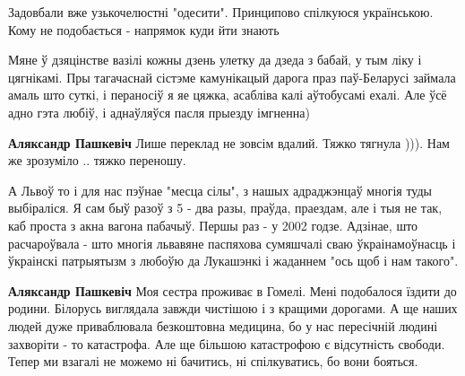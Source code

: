 \begin{itemize}
Задовбали вже узькочелюстні "одесити". Принципово спілкуюся українською. Кому не подобається - напрямок куди йти знають

 

Мяне ў дзяцінстве вазілі кожны дзень улетку да дзеда з бабай, у тым ліку і
цягнікамі. Пры тагачаснай сістэме камунікацый дарога праз паў-Беларусі займала
амаль што суткі, і пераносіў я яе цяжка, асабліва калі аўтобусамі ехалі. Але
ўсё адно гэта любіў, і аднаўляўся пасля прыезду імгненна)

\begin{itemize}
 
\textbf{Аляксандр Пашкевіч} Лише переклад не зовсім вдалий. Тяжко тягнула ))). Нам же зрозуміло .. тяжко переношу.
\end{itemize}

 

А Львоў то і для нас пэўнае "месца сілы", з нашых адраджэнцаў многія туды
выбіраліся. Я сам быў разоў з 5 - два разы, праўда, праездам, але і тыя не так,
каб проста з акна вагона пабачыў. Першы раз - у 2002 годзе. Адзінае, што
расчароўвала - што многія львавяне паспяхова сумяшчалі сваю ўкраінамоўнасць і
ўкраінскі патрыятызм з любоўю да Лукашэнкі і жаданнем "ось щоб і нам такого".

\begin{itemize}
 
\textbf{Аляксандр Пашкевіч} Моя сестра проживає в Гомелі. Мені подобалося їздити до родини. Білорусь виглядала завжди чистішою і з кращими дорогами. А ще наших людей дуже приваблювала безкоштовна медицина, бо у нас пересічній людині захворіти - то катастрофа. Але ще більшою катастрофою є відсутність свободи. Тепер ми взагалі не можемо ні бачитись, ні спілкуватись, бо вони бояться.
\end{itemize}


\end{itemize}
